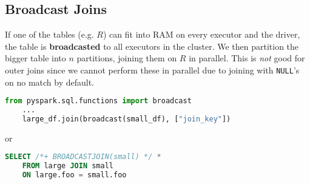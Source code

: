 \documentclass{report}
\renewcommand{\bf}[1]{\textbf{{#1}}}
\renewcommand{\tt}[1]{\texttt{{#1}}}
\renewcommand{\it}[1]{\textit{{#1}}}
\begin{document}
\subsection{Broadcast Joins}
If one of the tables (e.g. $R$) can fit into RAM on every executor and the
driver, the table is \bf{broadcasted} to all executors in the cluster. We then
partition the bigger table into $n$ partitions, joining them on $R$ in parallel.
This is \it{not} good for outer joins since we cannot perform these in parallel
due to joining with \tt{NULL}'s on no match by default.
\lstset{ basicstyle=\small\ttfamily, mathescape }
{
    \centering
    \begin{lstlisting}[language=Python, style=colorEX]
    from pyspark.sql.functions import broadcast
    ...
    large_df.join(broadcast(small_df), ["join_key"])
    \end{lstlisting}
    \par
}
or
{
    \centering
    \begin{lstlisting}[language=SQL, style=colorEX]
    SELECT /*+ BROADCASTJOIN(small) */ *
    FROM large JOIN small
    ON large.foo = small.foo
    \end{lstlisting}
    \par
}
\end{document}
